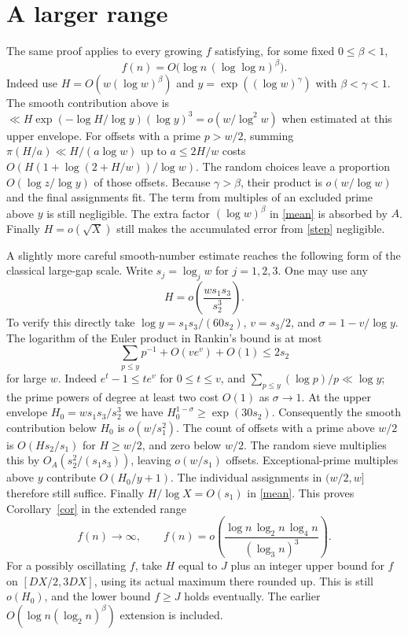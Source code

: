 \documentclass[10pt]{article}
\begin{document}
\section{A larger range}
The same proof applies to every growing $f$ satisfying, for some fixed $0\le\beta<1$,
\[
 f(n)=O\big(\log n\,(\log\log n)^\beta\big).
\]
Indeed use $H=O(w(\log w)^\beta)$ and $y=\exp((\log w)^\gamma)$ with $\beta<\gamma<1$. The smooth contribution above is $\ll H\exp(-\log H/\log y)(\log y)^3=o(w/\log^2 w)$ when estimated at this upper envelope. For offsets with a prime $p>w/2$, summing $\pi(H/a)\ll H/(a\log w)$ up to $a\le 2H/w$ costs $O(H(1+\log(2+H/w))/\log w)$. The random choices leave a proportion $O(\log z/\log y)$ of those offsets. Because $\gamma>\beta$, their product is $o(w/\log w)$ and the final assignments fit. The term from multiples of an excluded prime above $y$ is still negligible. The extra factor $(\log w)^\beta$ in \eqref{mean} is absorbed by $A$. Finally $H=o(\sqrt X)$ still makes the accumulated error from \eqref{step} negligible.


A slightly more careful smooth-number estimate reaches the following form of the classical large-gap scale. Write $s_j=\log_j w$ for $j=1,2,3$. One may use any
\[
 H=o\!\left(\frac{w s_1s_3}{s_2^3}\right).
\]
To verify this directly take $\log y=s_1s_3/(60s_2)$, $v=s_3/2$, and $\sigma=1-v/\log y$. The logarithm of the Euler product in Rankin's bound is at most
\[
 \sum_{p\le y}p^{-1}+O(v e^v)+O(1)\le 2s_2
\]
for large $w$. Indeed $e^t-1\le te^v$ for $0\le t\le v$, and $\sum_{p\le y}(\log p)/p\ll\log y$; the prime powers of degree at least two cost $O(1)$ as $\sigma\to1$. At the upper envelope $H_0=w s_1s_3/s_2^3$ we have $H_0^{1-\sigma}\ge\exp(30s_2)$. Consequently the smooth contribution below $H_0$ is $o(w/s_1^2)$. The count of offsets with a prime above $w/2$ is $O(Hs_2/s_1)$ for $H\ge w/2$, and zero below $w/2$. The random sieve multiplies this by $O_A(s_2^2/(s_1 s_3))$, leaving $o(w/s_1)$ offsets. Exceptional-prime multiples above $y$ contribute $O(H_0/y+1)$. The individual assignments in $(w/2,w]$ therefore still suffice. Finally $H/\log X=O(s_1)$ in \eqref{mean}. This proves Corollary~\ref{cor} in the extended range
\[
  f(n)\longrightarrow\infty,\qquad
  f(n)=o\!\left(\frac{\log n\,\log_2 n\,\log_4 n}{(\log_3 n)^3}\right).
\]
For a possibly oscillating $f$, take $H$ equal to $J$ plus an integer upper bound for $f$ on $[DX/2,3DX]$, using its actual maximum there rounded up. This is still $o(H_0)$, and the lower bound $f\ge J$ holds eventually. The earlier $O(\log n(\log_2 n)^\beta)$ extension is included.
\end{document}
